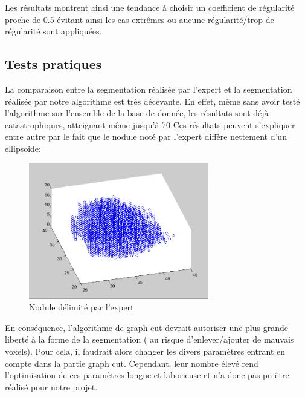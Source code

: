 \documentclass{article}
\begin{document}
Les résultats montrent ainsi une tendance à choisir un coefficient de régularité proche de 0.5 évitant ainsi les cas extrêmes ou aucune régularité/trop de régularité sont appliquées.

\subsection{Tests pratiques}

La comparaison entre la segmentation réalisée par l'expert et la segmentation réalisée par notre algorithme est très décevante. En effet, même sans avoir testé l'algorithme sur l'ensemble de la base de donnée, les résultats sont déjà catastrophiques, atteignant même jusqu'à 70%
Ces résultats peuvent s'expliquer entre autre par le fait que le nodule noté par l'expert diffère nettement d'un ellipsoide:
\begin{figure}[!h]
	\begin{center}
		\includegraphics[width=0.7\textwidth]{Images/Tests/forme_expert.png} 
	\end{center}
	\caption{Nodule délimité par l'expert}
	\label{fig:expert_nodule}
\end{figure}
En conséquence, l'algorithme de graph cut devrait autoriser une plus grande liberté à la forme de la segmentation ( au risque d'enlever/ajouter de mauvais voxels). Pour cela, il faudrait alors changer les divers paramètres entrant en compte dans la partie graph cut. Cependant, leur nombre élevé rend l'optimisation de ces paramètres longue et laborieuse et n'a donc pas pu être réalisé pour notre projet.
\end{document}
